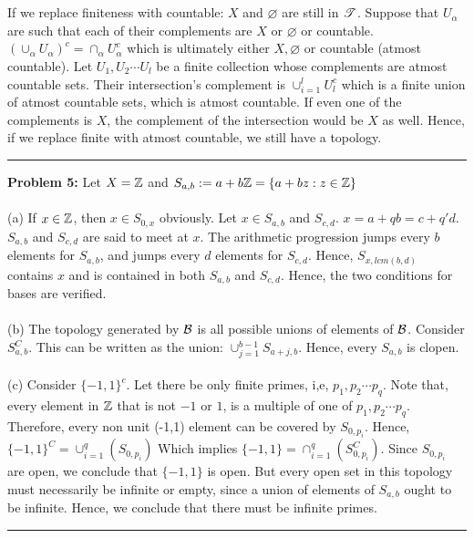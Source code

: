 \documentclass[main.tex]{subfiles}
\begin{document}
\\\\ If we replace finiteness with countable: $X$ and $\varnothing$ are still in $\mathscr T$. Suppose that $U_{\alpha}$ are such that each of their complements are $X$ or $\varnothing$ or countable. $(\cup_{\alpha} U_{\alpha})^c=\cap_{\alpha} U^c_{\alpha}$ which is ultimately either $X, \varnothing$ or countable (atmost countable). Let $U_1,U_2 \cdots U_l$ be a finite collection whose complements are atmost countable sets. Their intersection's complement is $\cup_{i=1}^l U_l^c$ which is a finite union of atmost countable sets, which is atmost countable. If even one of the complements is $X$, the complement of the intersection would be $X$ as well. 
Hence, if we replace finite with atmost countable, we still have a topology.
\par\noindent\rule{\textwidth}{0.4pt}
\textbf{Problem 5:} Let $X= \mathbb Z$ and $S_{a,b}:=a+b\mathbb Z=\{a+bz:z \in \mathbb Z\}$
\\\\ (a) If $x \in \mathbb Z$, then $x \in S_{0,x}$ obviously. Let $x \in S_{a,b}$ and $S_{c,d}$. $x=a+qb=c+q'd$. $S_{a,b}$ and $S_{c,d}$ are said to meet at $x$. The arithmetic progression jumps every $b$ elements for $S_{a,b}$, and jumps every $d$ elements for $S_{c,d}$. Hence, $S_{x,lcm(b,d)}$ contains $x$ and is contained in both $S_{a,b}$ and $S_{c,d}$. Hence, the two conditions for bases are verified.
\\\\ (b) The topology generated by $\mathcal B$ is all possible unions of elements of $\mathcal B$. Consider $S_{a,b}^C$. This can be written as the union: $\cup_{j=1}^{b-1} S_{a+j,b}$. Hence, every $S_{a,b}$ is clopen.
\\\\ (c) Consider $\{-1,1\}^c$. Let there be only finite primes, i,e, $p_1,p_2 \cdots p_q$. Note that, every element in $\mathbb Z$ that is not $-1$ or $1$, is a multiple of one of $p_1,p_2 \cdots p_q$. Therefore, every non unit (-1,1) element can be covered by $S_{0,p_i}$. Hence, $\{-1,1\}^C= \cup_{i=1}^{q} (S_{0,p_i})$ Which implies $\{-1,1\}=\cap_{i=1}^q (S_{0,p_i}^C)$. Since $S_{0,p_i}$ are open, we conclude that $\{-1,1\}$ is open. But every open set in this topology must necessarily be infinite or empty, since a union of elements of $S_{a,b}$ ought to be infinite. Hence, we conclude that there must be infinite primes.
\par\noindent\rule{\textwidth}{0.4pt}
\end{document}

